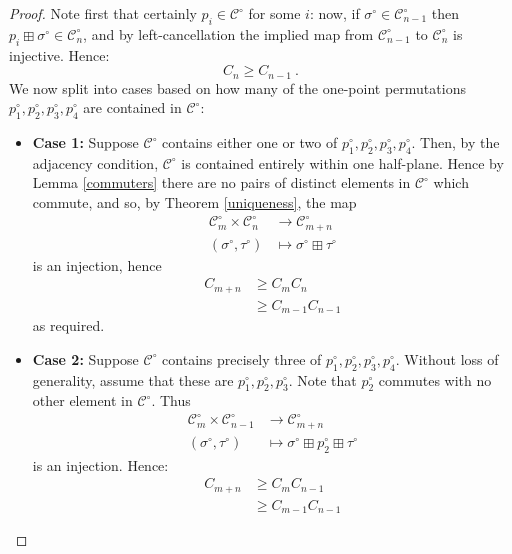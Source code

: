 \documentclass[11pt,a4paper]{article}
\theoremstyle{definition}
\begin{document}
\begin{proof}
Note first that certainly $p_{i} \in \mathcal{C}^{\circ}$ for some $i$: now, if $\sigma^{\circ} \in \mathcal{C}^{\circ}_{n-1}$ then $p_{i} \boxplus \sigma^{\circ} \in \mathcal{C}^{\circ}_{n}$, and by left-cancellation the implied map from $\mathcal{C}^{\circ}_{n-1}$ to $\mathcal{C}^{\circ}_{n}$ is injective. Hence:
\[
C_{n} \geq C_{n-1} \ .
\]
We now split into cases based on how many of the one-point permutations $p^{\circ}_{1}, p^{\circ}_{2}, p^{\circ}_{3}, p^{\circ}_{4}$ are contained in $\mathcal{C}^{\circ}$:
\begin{itemize}
\item \textbf{Case 1:} Suppose $\mathcal{C}^{\circ}$ contains either one or two of $p^{\circ}_{1}, p^{\circ}_{2}, p^{\circ}_{3}, p^{\circ}_{4}$. Then, by the adjacency condition, $\mathcal{C}^{\circ}$ is contained entirely within one half-plane. Hence by Lemma \ref{commuters} there are no pairs of distinct elements in $\mathcal{C}^{\circ}$ which commute, and so, by Theorem \ref{uniqueness}, the map
\[
\begin{split}
\mathcal{C}^{\circ}_{m} \times \mathcal{C}^{\circ}_{n} & \rightarrow \mathcal{C}^{\circ}_{m+n} \\
\left(\sigma^{\circ}, \tau^{\circ}\right) & \mapsto \sigma^{\circ} \boxplus \tau^{\circ}
\end{split}
\]
is an injection, hence
\[
\begin{split}
C_{m+n} & \geq C_{m}C_{n} \\
 & \geq C_{m-1}C_{n-1}
\end{split}
\]
as required.
\item \textbf{Case 2:} Suppose $\mathcal{C}^{\circ}$ contains precisely three of $p^{\circ}_{1}, p^{\circ}_{2}, p^{\circ}_{3}, p^{\circ}_{4}$. Without loss of generality, assume that these are $p^{\circ}_{1}, p^{\circ}_{2}, p^{\circ}_{3}$. Note that $p^{\circ}_{2}$ commutes with no other element in $\mathcal{C}^{\circ}$. Thus
\[
\begin{split}
\mathcal{C}^{\circ}_{m} \times \mathcal{C}^{\circ}_{n-1} & \rightarrow \mathcal{C}^{\circ}_{m+n} \\
\left(\sigma^{\circ}, \tau^{\circ}\right) & \mapsto \sigma^{\circ} \boxplus p^{\circ}_{2} \boxplus \tau^{\circ}
\end{split}
\]
is an injection. Hence:
\[
\begin{split}
C_{m+n} & \geq C_{m}C_{n-1} \\
 & \geq C_{m-1}C_{n-1}
\end{split}
\]
\end{itemize}
\end{proof}
\end{document}
